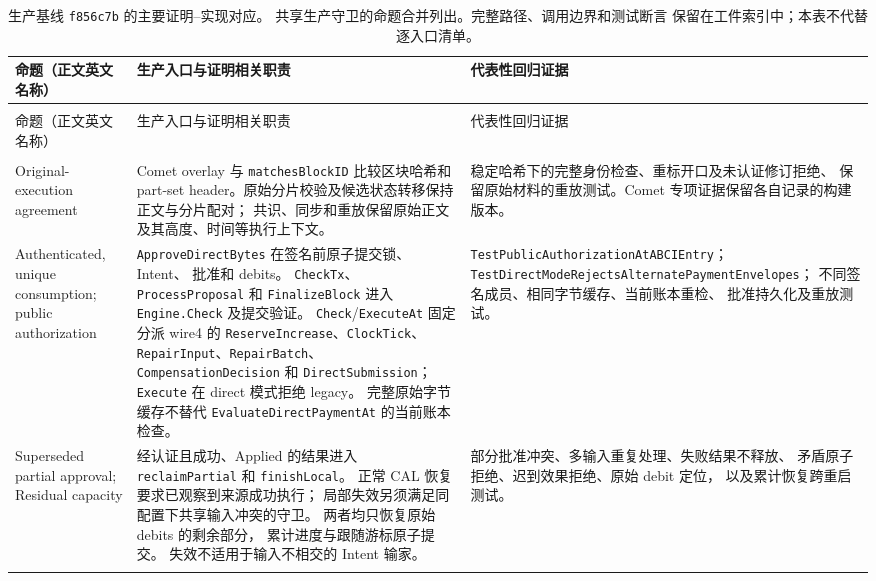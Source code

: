 \begin{longtable}{@{}
    >{\raggedright\arraybackslash}p{}
    >{\raggedright\arraybackslash}p{}
    >{\raggedright\arraybackslash}p{}
    @{}}
\caption{生产基线 \texttt{f856c7b} 的主要证明--实现对应。
共享生产守卫的命题合并列出。完整路径、调用边界和测试断言
保留在工件索引中；本表不代替逐入口清单。}
\label{tab:proof-implementation}\\
\toprule
命题（正文英文名称） &
生产入口与证明相关职责 &
代表性回归证据 \\
\midrule
\endfirsthead

\multicolumn{3}{@{}l}{表~\thetable\ （续）}\\
\toprule
命题（正文英文名称） &
生产入口与证明相关职责 &
代表性回归证据 \\
\midrule
\endhead

\midrule
\multicolumn{3}{r@{}}{续下页}\\
\endfoot

\bottomrule
\endlastfoot

Original-execution agreement
&
Comet overlay 与 \texttt{matchesBlockID} 比较区块哈希和
part-set header。原始分片校验及候选状态转移保持正文与分片配对；
共识、同步和重放保留原始正文及其高度、时间等执行上下文。
&
稳定哈希下的完整身份检查、重标开口及未认证修订拒绝、
保留原始材料的重放测试。Comet 专项证据保留各自记录的构建版本。
\\
\addlinespace[3pt]

Authenticated, unique consumption;
public authorization
&
\texttt{ApproveDirectBytes} 在签名前原子提交锁、Intent、
批准和 debits。
\texttt{CheckTx}、\texttt{ProcessProposal} 和
\texttt{FinalizeBlock} 进入
\texttt{Engine.Check} 及提交验证。
\texttt{Check}/\texttt{ExecuteAt} 固定分派 wire4 的
\texttt{ReserveIncrease}、\texttt{ClockTick}、
\texttt{RepairInput}、\texttt{RepairBatch}、
\texttt{CompensationDecision} 和 \texttt{DirectSubmission}；
\texttt{Execute} 在 direct 模式拒绝 legacy。
完整原始字节缓存不替代
\texttt{EvaluateDirectPaymentAt} 的当前账本检查。
&
\texttt{TestPublicAuthorization\allowbreak AtABCIEntry}；
\texttt{TestDirectModeRejects\allowbreak AlternatePayment\allowbreak Envelopes}；
不同签名成员、相同字节缓存、当前账本重检、
批准持久化及重放测试。
\\
\addlinespace[3pt]

Superseded partial approval;
Residual capacity
&
经认证且成功、Applied 的结果进入
\texttt{reclaimPartial} 和 \texttt{finishLocal}。
正常 CAL 恢复要求已观察到来源成功执行；
局部失效另须满足同配置下共享输入冲突的守卫。
两者均只恢复原始 debits 的剩余部分，
累计进度与跟随游标原子提交。
失效不适用于输入不相交的 Intent 输家。
&
部分批准冲突、多输入重复处理、失败结果不释放、
矛盾原子拒绝、迟到效果拒绝、原始 debit 定位，
以及累计恢复跨重启测试。
\\
\addlinespace[3pt]


\end{longtable}
